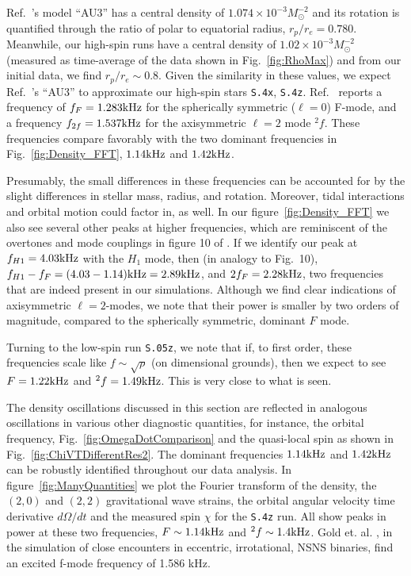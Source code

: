 {Ref.~\cite{Dimmelmeier:2005zk}'s model ``AU3'' has a central density of
$1.074 \times 10^{-3} M_{\odot}^{-2}$ and its rotation is
quantified through the ratio of polar to equatorial radius,
$r_p/r_e = 0.780$.
Meanwhile, our high-spin runs have a central density of
$1.02 \times 10^{-3} M_{\odot}^{-2}$ (measured as time-average of the data shown in
Fig.~\ref{fig:RhoMax}) and from our initial data, we find
$r_p/r_e \sim 0.8$. Given the similarity in these
values, we expect Ref.~\cite{Dimmelmeier:2005zk}'s ``AU3'' to approximate our high-spin
stars {\tt S.4x}, {\tt S.4z}.
Ref.~\cite{Dimmelmeier:2005zk} reports a frequency of
$f_F=1.283\rm{kHz}$ for the spherically symmetric ($\ell=0$) F-mode,
and a frequency $f_{2f}=1.537\rm{kHz}$ for the axisymmetric $\ell=2$
mode $^2f$.  These frequencies compare favorably with the two dominant
frequencies in Fig.~\ref{fig:Density_FFT}, $1.14\rm{kHz}$ and
$1.42\rm{kHz}$.

Presumably, the small differences in these frequencies can be
accounted for by the slight differences in stellar mass, radius, and
rotation.  Moreover, tidal interactions and orbital motion could
factor in, as well. In our figure~\ref{fig:Density_FFT} we also see
several other peaks at higher frequencies, which are reminiscent of
the overtones and mode couplings in figure 10 of
\cite{Dimmelmeier:2005zk}. If we identify our peak at
  $f_{H1}=4.03\rm{kHz}$ with the $H_1$ mode, then (in analogy to
  \cite{Dimmelmeier:2005zk} Fig.~10), 
  $f_{H1}-f_{F}=(4.03-1.14)\rm{kHz}=2.89\rm{kHz}$, and
  $2f_{F}=2.28\rm{kHz}$, two frequencies that are indeed present in
  our simulations.
Although we find clear indications of axisymmetric $\ell=2$-modes,
we note that their power is smaller by two orders of magnitude,
compared to the spherically symmetric, dominant $F$ mode. 

Turning to the low-spin run {\tt S.05z}, we note that if, to first order,
these frequencies scale like $f\sim\sqrt{\rho}$ (on dimensional
grounds), then we expect to see $F=1.22\rm{kHz}$ and
$^2f=1.49\rm{kHz}$. This is very close to what is seen.


The density oscillations discussed in this section are reflected in
analogous oscillations in various other diagnostic quantities, for
instance, the orbital frequency, Fig.~\ref{fig:OmegaDotComparison} and
the quasi-local spin as shown in Fig.~\ref{fig:ChiVTDifferentRes2}.
The dominant frequencies $1.14\rm{kHz}$ and $1.42\rm{kHz}$ can be
robustly identified throughout our data analysis. In
figure~\ref{fig:ManyQuantities} we plot the Fourier transform of the
density, the $(2,0)$ and $(2,2)$ gravitational wave strains, the
orbital angular velocity time derivative $d\Omega/dt$ and the
measured spin $\chi$ for the {\tt S.4z} run. All show peaks in power at
these two frequencies, $F\sim1.14\rm{kHz}$ and $^2f\sim1.4\rm{kHz}$.
Gold et. al. \cite{Gold:2011df}, in the simulation of close encounters in eccentric, irrotational, NSNS binaries, 
find an excited f-mode frequency of 1.586 kHz.

}
